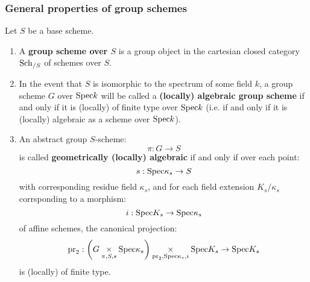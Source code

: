             \subsubsection{General properties of group schemes}
                \begin{definition} \label{def: algebraic_groups} 
                    Let $S$ be a base scheme.
                    \begin{enumerate}
                        \item A \textbf{group scheme over $S$} is a group object in the cartesian closed category $\mathrm{Sch}_{/S}$ of schemes over $S$. 
                        \item In the event that $S$ is isomorphic to the spectrum of some field $k$, a group scheme $G$ over $\mathrm{Spec} k$ will be called a \textbf{(locally) algebraic group scheme} if and only if it is (locally) of finite type over $\mathrm{Spec} k$ (i.e. if and only if it is (locally) algebraic as a scheme over $\mathrm{Spec} k$).
                        \item An abstract group $S$-scheme:
                            $$\pi: G \to S$$
                        is called \textbf{geometrically (locally) algebraic} if and only if over each point:
                            $$s: \mathrm{Spec} \kappa_s \to S$$
                        with corresponding residue field $\kappa_s$, and for each field extension $K_s/\kappa_s$ corrsponding to a morphism:
                            $$i: \mathrm{Spec} K_s \to \mathrm{Spec} \kappa_s$$
                        of affine schemes, the canonical projection:
                            $$\pr_2: \left(G \x_{\pi, S, s} \Spec \kappa_s\right) \x_{\pr_2, \Spec \kappa_s, i} \Spec K_s \to \Spec K_s$$
                        is (locally) of finite type.
                    \end{enumerate}
                \end{definition}
